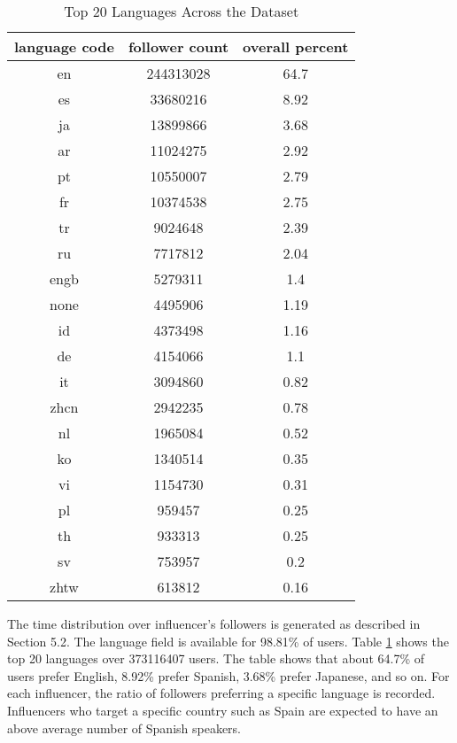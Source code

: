\begin{table}
\small
\caption{Top 20 Languages Across the Dataset}
\label{table_2_app2}
\begin{center}
\begin{tabular}{|c|c|c|}
\hline
\bfseries language code& \bfseries follower count& \bfseries overall percent\\
\hline
en&244313028&64.7\\
\hline
es&33680216&8.92\\
\hline
ja&13899866&3.68\\
\hline
ar&11024275&2.92\\
\hline
pt&10550007&2.79\\
\hline
fr&10374538&2.75\\
\hline
tr&9024648&2.39\\
\hline
ru&7717812&2.04\\
\hline
engb&5279311&1.4\\
\hline
none&4495906&1.19\\
\hline
id&4373498&1.16\\
\hline
de&4154066&1.1\\
\hline
it&3094860&0.82\\
\hline
zhcn&2942235&0.78\\
\hline
nl&1965084&0.52\\
\hline
ko&1340514&0.35\\
\hline
vi&1154730&0.31\\
\hline
pl&959457&0.25\\
\hline
th&933313&0.25\\
\hline
sv&753957&0.2\\
\hline
zhtw&613812&0.16\\
\hline
\end{tabular}
\end{center}
\end{table}

The time distribution over influencer's followers is generated as described in Section 5.2. The language field is available for 98.81\% of users. %
Table \ref{table_2_app2} shows the top 20 languages over 373116407 users. The table shows that about 64.7\% of users prefer English, 8.92\% prefer Spanish, 3.68\%  prefer Japanese, and so on. %
For each influencer, the ratio of followers preferring a specific language is recorded. Influencers who target a specific country such as Spain are expected to have an above average number of Spanish speakers.

